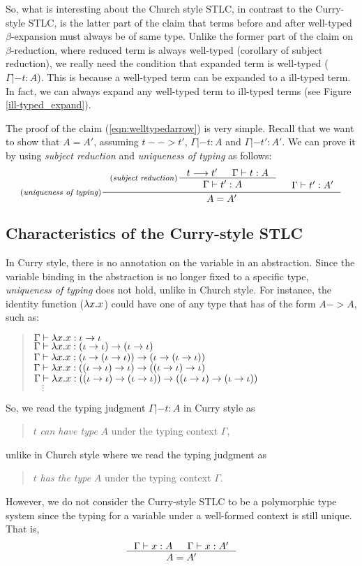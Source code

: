 So, what is interesting about the Church style STLC, in contrast to
the Curry-style STLC, is the latter part of the claim that terms before and
after well-typed $\beta$-expansion must always be of same type. Unlike
the former part of the claim on $\beta$-reduction, where reduced term
is always well-typed (corollary of subject reduction), we really need
the condition that expanded term is well-typed ($\Gamma |- t : A$).
This is because a well-typed term can be expanded to a ill-typed term.
In fact, we can always expand any well-typed term to ill-typed terms
(see Figure \ref{ill-typed_expand}).

The proof of the claim (\ref{eqn:welltypedarrow}) is very simple.
Recall that we want to show that $A = A'$,
assuming $t --> t'$, $\Gamma |- t : A$ and $\Gamma |- t' : A'$.
We can prove it by using \emph{subject reduction} and
\emph{uniqueness of typing} as follows:
\[ \inference[(\emph{uniqueness of typing})]
	{ \inference[(\emph{subject reduction})\!\!\!]
		{t --> t' & \Gamma |- t : A}
		{\Gamma |- t' : A \phantom{a_f}} 
	& \Gamma |- t' : A' }
	{ A = A' }
\]

\subsection{Characteristics of the Curry-style STLC}\label{sec:stlc:curry}
In Curry style, there is no annotation on the variable in an abstraction.
Since the variable binding in the abstraction is no longer fixed to
a specific type, \emph{uniqueness of typing} does not hold,
unlike in Church style. For instance, the identity function ($\lambda x.x$)
could have one of any type that has of the form $A -> A$, such as:
\begin{quote}\vspace*{-1em}
\begin{singlespace}
$\Gamma |- \lambda x.x : \iota -> \iota$ \\
$\Gamma |- \lambda x.x : (\iota -> \iota) -> (\iota -> \iota)$ \\
$\Gamma |- \lambda x.x : (\iota -> (\iota -> \iota)) -> (\iota -> (\iota -> \iota))$ \\
$\Gamma |- \lambda x.x : ((\iota -> \iota) -> \iota) -> ((\iota -> \iota) -> \iota)$ \\
$\Gamma |- \lambda x.x : ((\iota -> \iota) -> (\iota -> \iota)) -> ((\iota -> \iota) -> (\iota -> \iota))$ \\
$~~~~ \vdots $
\end{singlespace}
\end{quote}
So, we read the typing judgment $\Gamma |- t : A$ in Curry style as
\begin{quote}
$t$ \emph{can have type} $A$ under the typing context $\Gamma$,
\end{quote}
unlike in Church style where we read the typing judgment as
\begin{quote}
$t$ \emph{has the type} $A$ under the typing context $\Gamma$.
\end{quote}
However, we do not consider the Curry-style STLC to be
a polymorphic type system since the typing for a variable
under a well-formed context is still unique. That is,
\[ \inference{\Gamma |- x : A & \Gamma |- x : A'}{A = A'} \]

